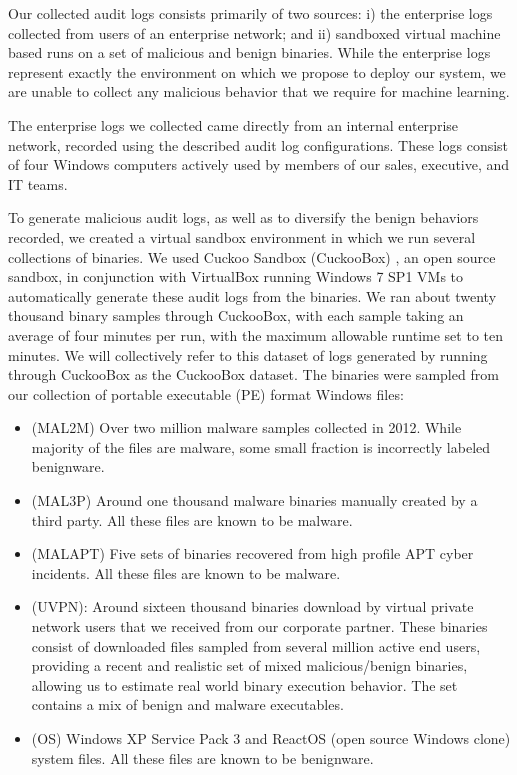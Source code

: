 \documentclass{sig-alternate-2013}
\begin{document}
Our collected audit logs consists primarily of two sources: i) the enterprise logs collected from users of an enterprise network; and ii) sandboxed virtual machine based runs on a set of malicious and benign binaries. While the enterprise logs represent exactly the environment on which we propose to deploy our system, we are unable to collect any malicious behavior that we require for machine learning. 

The enterprise logs we collected came directly from an internal enterprise network, recorded using the described audit log configurations. These logs consist of four Windows computers actively used by members of our sales, executive, and IT teams.

To generate malicious audit logs, as well as to diversify the benign behaviors recorded, we created a virtual sandbox environment in which we run several collections of binaries. We used Cuckoo Sandbox (CuckooBox) \cite{cuckoo2015}, an open source sandbox, in conjunction with VirtualBox \cite{virtualbox2015} running Windows 7 SP1 VMs to automatically generate these audit logs from the binaries. We ran about twenty thousand binary samples through CuckooBox, with each sample taking an average of four minutes per run, with the maximum allowable runtime set to ten minutes. We will collectively refer to this dataset of logs generated by running through CuckooBox as the CuckooBox dataset. The binaries were sampled from our collection of portable executable (PE) format Windows files:
\begin{itemize}
\item (MAL2M) Over two million malware samples collected in 2012. While majority of the files are malware, some small fraction is incorrectly labeled benignware.
\item (MAL3P) Around one thousand malware binaries manually created by a third party. All these files are known to be malware.
\item (MALAPT) Five sets of binaries recovered from high profile APT cyber incidents. All these files are known to be malware.
\item (UVPN): Around sixteen thousand binaries download by virtual private network users that we received from our corporate partner. These binaries consist of downloaded files sampled from several million active end users, providing a recent and realistic set of mixed malicious/benign binaries, allowing us to estimate real world binary execution behavior. The set contains a mix of benign and malware executables. 
\item (OS) Windows XP Service Pack 3 and ReactOS (open source Windows clone) system files. All these files are known to be benignware.
\end{itemize}
\end{document}
